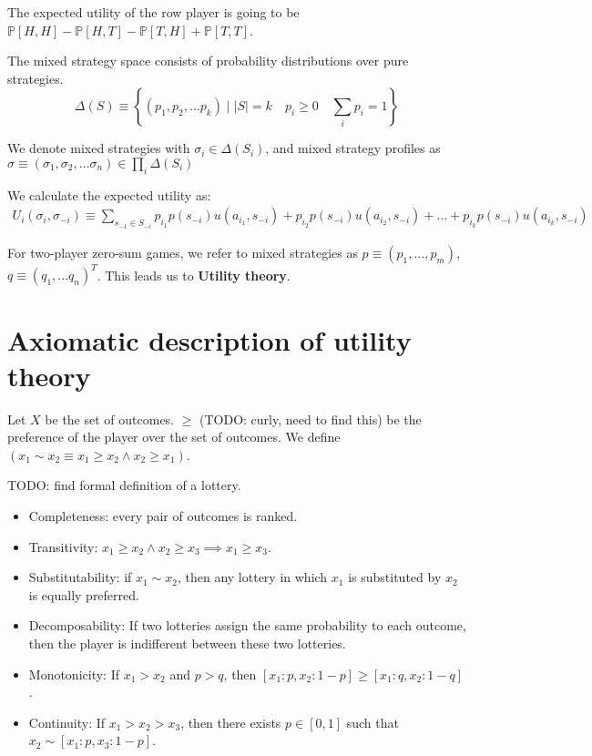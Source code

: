 \documentclass[11pt]{book}
\renewcommand{\P}[1]{\ensuremath{\mathbb{P} \left[ #1 \right] }}
\begin{document}
The expected utility of the row player is going to be $\P{H, H} - \P{H, T} - \P{T, H} + \P{T, T}$.

The mixed strategy space consists of probability distributions over pure strategies.
$$\Delta(S) \equiv \left\{ (p_1, p_2, \dots p_k) \mid |S| = k \quad p_i \geq 0 \quad \sum_i p_i = 1\right\}$$

We denote mixed strategies with $\sigma_i \in \Delta(S_i)$, and mixed
strategy profiles as $\sigma \equiv  (\sigma_1, \sigma_2, \dots \sigma_n) \in \prod_i \Delta(S_i)$


We calculate the expected utility as:
\begin{align*}
    U_i(\sigma_i, \sigma_{-i}) \equiv
    \sum_{s_{-1} \in S_{-i}} 
p_{i_1} p(s_{-i}) u(a_{i_1}, s_{-i}) +
p_{i_2} p(s_{-i}) u(a_{i_2}, s_{-i}) + \dots +
    p_{i_k} p(s_{-i}) u(a_{i_k}, s_{-i})
\end{align*}

For two-player zero-sum games, we refer to mixed strategies as 
$p \equiv (p_1, \dots, p_m)$,
$q \equiv (q_1, \dots q_n)^T$. This leads us to \textbf{Utility theory}.


\section{Axiomatic description of utility theory}
Let $X$ be the set of outcomes. $\geq$ (TODO: curly, need to find this) be the
preference of the player over the set of outcomes.
We define $\left( x_1 \sim x_2 \equiv x_1 \geq x_2 \land x_2 \geq x_1 \right)$.

TODO: find formal definition of a lottery.

\begin{itemize}
    \item Completeness: every pair of outcomes is ranked.
    \item Transitivity: $x_1 \geq x_2 \land x_2 \geq x_3 \implies x_1 \geq x_3$.
    \item Substitutability: if $x_1 \sim x_2$, then any lottery in which $x_1$
        is substituted by $x_2$ is equally preferred.
    \item Decomposability: If two lotteries assign the same probability to
        each outcome, then the player is indifferent between these two lotteries.
    \item Monotonicity: If $x_1 > x_2$ and $p > q$, then $[x_1: p, x_2 : 1- p] \geq [x_1 : q, x_2 : 1 - q ]$.
    \item Continuity: If $x_1 > x_2 > x_3$, then there exists $p \in [0, 1]$
        such that $x_2 \sim [x_1: p, x_3: 1 - p]$.
\end{itemize}
\end{document}

